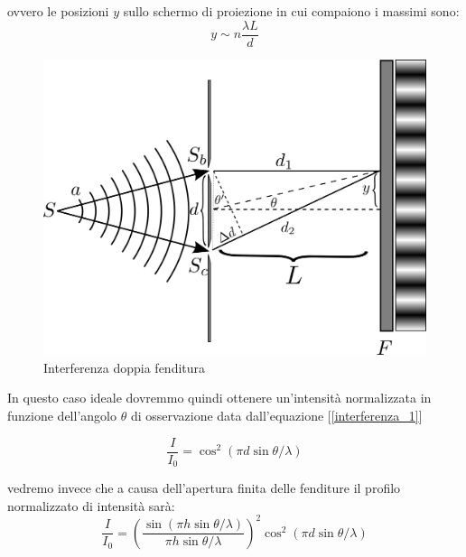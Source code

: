 \documentclass[a4paper,10pt,oneside]{article}
\begin{document}
ovvero le posizioni $y$ sullo schermo di proiezione in cui compaiono i massimi sono:
\begin{equation}
 y\sim n\frac{\lambda L}{d}
\end{equation}


\begin{figure}[H]
 \centering
 \includegraphics[width=\textwidth]{./Immagini/young.png}
 \caption{Interferenza doppia fenditura}
 \label{fig:young1}
\end{figure}

In questo caso ideale dovremmo quindi ottenere un'intensità normalizzata in funzione dell'angolo $\theta$ di osservazione data dall'equazione [\ref{interferenza_1}]

\begin{equation}\label{interferenza_1}
\frac{I}{I_0}=\cos^2(\pi d \sin\theta/\lambda)
\end{equation}

vedremo invece che a causa dell'apertura finita delle fenditure il profilo normalizzato di intensità sarà:
\begin{equation}
 \frac{I}{I_0}=\left( \frac{\sin(\pi h \sin\theta/\lambda)}{\pi h \sin\theta/\lambda}\right)^2\cos^2(\pi d\sin\theta /\lambda)
\end{equation}
\end{document}
